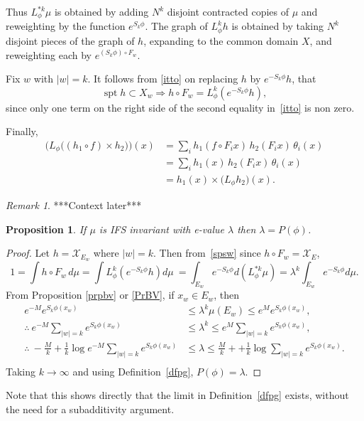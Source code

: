 \documentclass[a4paper]{amsart}
\theoremstyle{plain}
\newtheorem{proposition}[theorem]{Proposition}
\theoremstyle{definition}
\theoremstyle{remark}
\newtheorem{remark}[theorem]{Remark}
\DeclareMathOperator{\spt}{spt}
\begin{document}
Thus $ L^{*k}_\phi \mu $ is obtained by adding $ N^k $ disjoint contracted  copies    of $ \mu$ and reweighting by the function $ e^{S_k \phi } $.
The graph of $ L^k_\phi h $ is obtained by taking  $ N^k $ disjoint pieces of the graph of $ h $, expanding to the common domain $ X $, and reweighting each by $  e^{(S_k\phi)\circ F_w  } $.

\medskip
Fix $ w $ with $ |w|=k$. It follows from \eqref{itto} on replacing $ h $ by $ e^{-S_k\phi}h$, that
\begin{equation} \label{spsw}
\spt h \subset X_w \Longrightarrow h \circ F_w = L^k_\phi \left(e^{-S_k\phi}h \right),
\end{equation}
since only one term on the right side of the second equality in~\eqref{itto} is non zero.

\medskip
Finally,
\begin{equation} \label{}
\begin{aligned} 
\Big(L_\phi\big((h_1\circ f)\times h_2\big) \Big)(x) 
   &= \sum_i h_1(f\circ F_ix)\, h_2(F_i x)\, \theta_i(x) \\
   &= \sum_i h_1(x)\, h_2(F_ix)\, \theta_i(x) \\
    &= h_1(x)\times \big(L_\phi h_2\big)(x).
\end{aligned} 
 \end{equation} 

\begin{remark} ***Context later***
\begin{proposition} If $ \mu $ is IFS invariant with e-value $ \lambda $  then $ \lambda = P(\phi) $.
\end{proposition}

\begin{proof}
  Let $ h = \mathcal{X} _{E_w} $ where $ |w|=k $.  Then from~\eqref{spsw} since $ h \circ F_w = \mathcal{X}_E $,
\[
1 = \int h \circ F_w \, d\mu  = \int L^k_\phi \left( e^{-S_k\phi}h\right) d \mu \
= \int_{E_w} e^{-S_k\phi} d \left(L^{*k}_\phi \mu\right) = \lambda ^k \int_{E_w} e^{-S_k\phi} d\mu.
\]
 From Proposition \ref{prpbv} or  \eqref{PrBV}, if $ x_w \in E_w $, then 
 \begin{align*}  
e^{-M} e^{S_k\phi(x_w)} &\leq \lambda ^k \mu (E_w) \leq e^{M} e^{S_k\phi(x_w)},\\
\therefore\  
 e^{-M} \sum_{|w|=k} e^{S_k\phi(x_w)} &\leq \lambda ^k   \leq e^{M}  \sum_{|w|=k} e^{S_k\phi(x_w)},\\
\therefore\   -\frac{M}{k} +\frac{1}{k}\log  e^{-M} \sum_{|w|=k} e^{S_k\phi(x_w)} &\leq \lambda  \leq 
         \frac{M}{k} +  +\frac{1}{k} \log \sum_{|w|=k} e^{S_k\phi(x_w)}.\\
 \end{align*} 
Taking $ k \to \infty $ and using Definition~\ref{dfpg},  $ P(\phi) =  \lambda $.
 \end{proof} 
 
 Note that this shows directly that the limit in Definition~\ref{dfpg} exists, without the need for a subadditivity argument.
\end{remark} 
\end{document}
